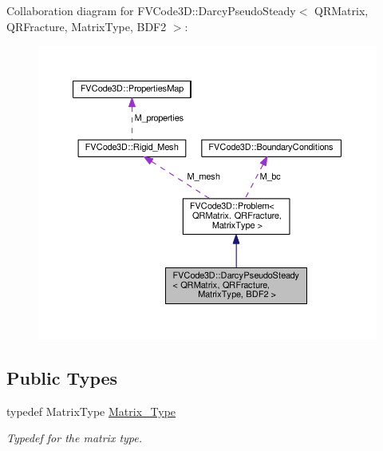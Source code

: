 Collaboration diagram for F\+V\+Code3D\+:\+:Darcy\+Pseudo\+Steady$<$ Q\+R\+Matrix, Q\+R\+Fracture, Matrix\+Type, B\+D\+F2 $>$\+:
\nopagebreak
\begin{figure}[H]
\begin{center}
\leavevmode
\includegraphics[width=350pt]{classFVCode3D_1_1DarcyPseudoSteady_3_01QRMatrix_00_01QRFracture_00_01MatrixType_00_01BDF2_01_4__coll__graph}
\end{center}
\end{figure}
\subsection*{Public Types}
\begin{DoxyCompactItemize}
\item 
typedef Matrix\+Type \hyperlink{classFVCode3D_1_1DarcyPseudoSteady_3_01QRMatrix_00_01QRFracture_00_01MatrixType_00_01BDF2_01_4_a81a6ca6f572760bbfc094ade854ae054}{Matrix\+\_\+\+Type}
\begin{DoxyCompactList}\small\item\em Typedef for the matrix type. \end{DoxyCompactList}\end{DoxyCompactItemize}
